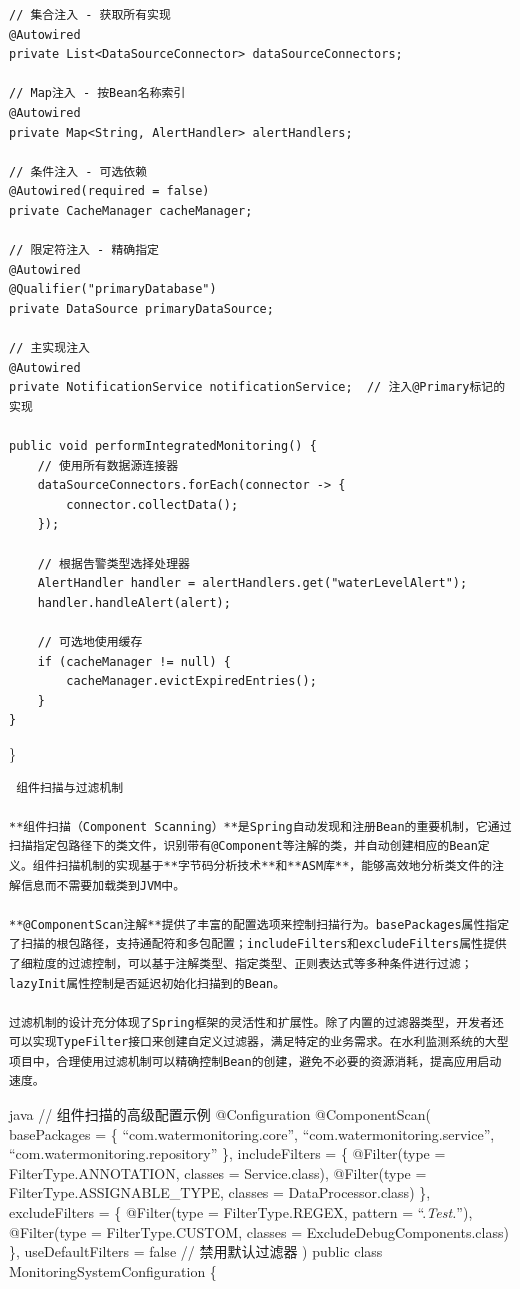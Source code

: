 \begin{verbatim}
// 集合注入 - 获取所有实现
@Autowired
private List<DataSourceConnector> dataSourceConnectors;

// Map注入 - 按Bean名称索引
@Autowired
private Map<String, AlertHandler> alertHandlers;

// 条件注入 - 可选依赖
@Autowired(required = false)
private CacheManager cacheManager;

// 限定符注入 - 精确指定
@Autowired
@Qualifier("primaryDatabase")
private DataSource primaryDataSource;

// 主实现注入
@Autowired
private NotificationService notificationService;  // 注入@Primary标记的实现

public void performIntegratedMonitoring() {
    // 使用所有数据源连接器
    dataSourceConnectors.forEach(connector -> {
        connector.collectData();
    });
    
    // 根据告警类型选择处理器
    AlertHandler handler = alertHandlers.get("waterLevelAlert");
    handler.handleAlert(alert);
    
    // 可选地使用缓存
    if (cacheManager != null) {
        cacheManager.evictExpiredEntries();
    }
}
\end{verbatim}

\}

\begin{lstlisting}
 组件扫描与过滤机制

**组件扫描（Component Scanning）**是Spring自动发现和注册Bean的重要机制，它通过扫描指定包路径下的类文件，识别带有@Component等注解的类，并自动创建相应的Bean定义。组件扫描机制的实现基于**字节码分析技术**和**ASM库**，能够高效地分析类文件的注解信息而不需要加载类到JVM中。

**@ComponentScan注解**提供了丰富的配置选项来控制扫描行为。basePackages属性指定了扫描的根包路径，支持通配符和多包配置；includeFilters和excludeFilters属性提供了细粒度的过滤控制，可以基于注解类型、指定类型、正则表达式等多种条件进行过滤；lazyInit属性控制是否延迟初始化扫描到的Bean。

过滤机制的设计充分体现了Spring框架的灵活性和扩展性。除了内置的过滤器类型，开发者还可以实现TypeFilter接口来创建自定义过滤器，满足特定的业务需求。在水利监测系统的大型项目中，合理使用过滤机制可以精确控制Bean的创建，避免不必要的资源消耗，提高应用启动速度。
\end{lstlisting}

java // 组件扫描的高级配置示例 @Configuration @ComponentScan( basePackages = \{ ``com.watermonitoring.core'', ``com.watermonitoring.service'', ``com.watermonitoring.repository'' \}, includeFilters = \{ @Filter(type = FilterType.ANNOTATION, classes = Service.class), @Filter(type = FilterType.ASSIGNABLE\_TYPE, classes = DataProcessor.class) \}, excludeFilters = \{ @Filter(type = FilterType.REGEX, pattern = ``.\emph{Test.}''), @Filter(type = FilterType.CUSTOM, classes = ExcludeDebugComponents.class) \}, useDefaultFilters = false // 禁用默认过滤器 ) public class MonitoringSystemConfiguration \{

